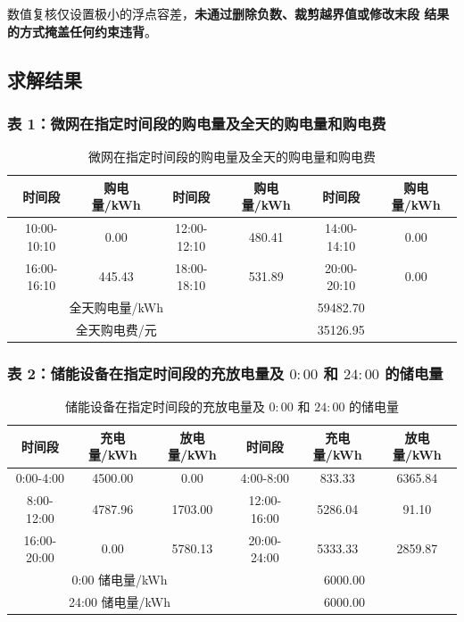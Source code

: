 \documentclass[withoutpreface,bwprint]{cumcmthesis}
\begin{document}
数值复核仅设置极小的浮点容差，\textbf{未通过删除负数、裁剪越界值或修改末段
结果的方式掩盖任何约束违背}。

\subsection{求解结果}

\subsubsection{表 1：微网在指定时间段的购电量及全天的购电量和购电费}

\begin{table}[htbp]
  \centering
  \caption{微网在指定时间段的购电量及全天的购电量和购电费}
  \label{tab:p1-buy}
  \begin{tabular}{cccccc}
    \toprule
    时间段 & 购电量/kWh & 时间段 & 购电量/kWh & 时间段 & 购电量/kWh \\
    \midrule
    10:00-10:10 & 0.00 & 12:00-12:10 & 480.41 & 14:00-14:10 & 0.00 \\
    16:00-16:10 & 445.43 & 18:00-18:10 & 531.89 & 20:00-20:10 & 0.00 \\
    \midrule
    \multicolumn{3}{c}{全天购电量/kWh} & \multicolumn{3}{c}{59482.70} \\
    \multicolumn{3}{c}{全天购电费/元}   & \multicolumn{3}{c}{35126.95} \\
    \bottomrule
  \end{tabular}
\end{table}

\subsubsection{表 2：储能设备在指定时间段的充放电量及 $0{:}00$ 和 $24{:}00$ 的储电量}

\begin{table}[htbp]
  \centering
  \caption{储能设备在指定时间段的充放电量及 $0{:}00$ 和 $24{:}00$ 的储电量}
  \label{tab:p1-storage}
  \begin{tabular}{cccccc}
    \toprule
    时间段 & 充电量/kWh & 放电量/kWh & 时间段 & 充电量/kWh & 放电量/kWh \\
    \midrule
    0:00-4:00   & 4500.00 & 0.00     & 4:00-8:00    & 833.33  & 6365.84 \\
    8:00-12:00  & 4787.96 & 1703.00  & 12:00-16:00  & 5286.04 & 91.10   \\
    16:00-20:00 & 0.00    & 5780.13  & 20:00-24:00  & 5333.33 & 2859.87 \\
    \midrule
    \multicolumn{3}{c}{0:00 储电量/kWh}  & \multicolumn{3}{c}{6000.00} \\
    \multicolumn{3}{c}{24:00 储电量/kWh} & \multicolumn{3}{c}{6000.00} \\
    \bottomrule
  \end{tabular}
\end{table}
\end{document}
